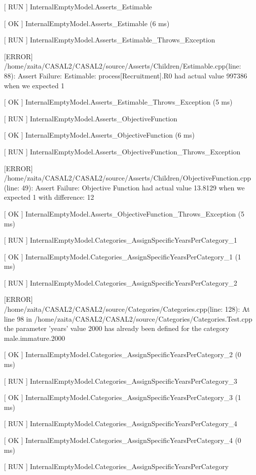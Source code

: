 \documentclass[a4paper,11pt,twoside,pdftex,draft]{article}
\begin{document}
{[} RUN {]} InternalEmptyModel.Asserts\_Estimable

{[} OK {]} InternalEmptyModel.Asserts\_Estimable (6 ms)

{[} RUN {]} InternalEmptyModel.Asserts\_Estimable\_Throws\_Exception

{[}ERROR{]}
/home/zaita/CASAL2/CASAL2/source/Asserts/Children/Estimable.cpp(line:
88): Assert Failure: Estimable: process{[}Recruitment{]}.R0 had actual
value 997386 when we expected 1

{[} OK {]} InternalEmptyModel.Asserts\_Estimable\_Throws\_Exception (5
ms)

{[} RUN {]} InternalEmptyModel.Asserts\_ObjectiveFunction

{[} OK {]} InternalEmptyModel.Asserts\_ObjectiveFunction (6 ms)

{[} RUN {]}
InternalEmptyModel.Asserts\_ObjectiveFunction\_Throws\_Exception

{[}ERROR{]}
/home/zaita/CASAL2/CASAL2/source/Asserts/Children/ObjectiveFunction.cpp(line:
49): Assert Failure: Objective Function had actual value 13.8129 when we
expected 1 with difference: 12

{[} OK {]}
InternalEmptyModel.Asserts\_ObjectiveFunction\_Throws\_Exception (5 ms)

{[} RUN {]}
InternalEmptyModel.Categories\_AssignSpecificYearsPerCategory\_1

{[} OK {]}
InternalEmptyModel.Categories\_AssignSpecificYearsPerCategory\_1 (1 ms)

{[} RUN {]}
InternalEmptyModel.Categories\_AssignSpecificYearsPerCategory\_2

{[}ERROR{]}
/home/zaita/CASAL2/CASAL2/source/Categories/Categories.cpp(line: 128):
At line 98 in
/home/zaita/CASAL2/CASAL2/source/Categories/Categories.Test.cpp the
parameter 'years' value 2000 has already been defined for the category
male.immature.2000

{[} OK {]}
InternalEmptyModel.Categories\_AssignSpecificYearsPerCategory\_2 (0 ms)

{[} RUN {]}
InternalEmptyModel.Categories\_AssignSpecificYearsPerCategory\_3

{[} OK {]}
InternalEmptyModel.Categories\_AssignSpecificYearsPerCategory\_3 (1 ms)

{[} RUN {]}
InternalEmptyModel.Categories\_AssignSpecificYearsPerCategory\_4

{[} OK {]}
InternalEmptyModel.Categories\_AssignSpecificYearsPerCategory\_4 (0 ms)

{[} RUN {]}
InternalEmptyModel.Categories\_AssignSpecificYearsPerCategory
\end{document}
